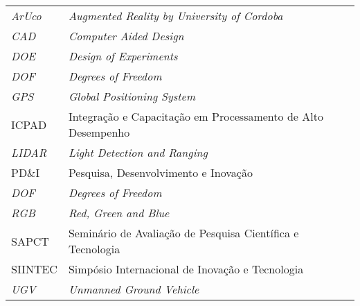 \begin{thesisabbreviations}
\begin{footnotesize}
\begin{longtable}[l]{p{2cm}l}
  \textit{ArUco}   \dotfill & \textit{Augmented Reality by University of Cordoba} \\
  \textit{CAD}      \dotfill &  \textit{Computer Aided Design} \\
  \textit{DOE}      \dotfill &  \textit{Design of Experiments} \\
  \textit{DOF}      \dotfill &  \textit{Degrees of Freedom} \\
  \textit{GPS}      \dotfill &  \textit{Global Positioning System} \\
  ICPAD      \dotfill &  Integração e Capacitação em Processamento de Alto Desempenho \\
  \textit{LIDAR} \dotfill & \textit{Light Detection and Ranging} \\
  PD\&I      \dotfill &  Pesquisa, Desenvolvimento e Inovação \\
    \textit{DOF}      \dotfill &  \textit{Degrees of Freedom} \\ 
    \textit{RGB}      \dotfill &  \textit{Red, Green and Blue} \\
  SAPCT      \dotfill &  Seminário de Avaliação de Pesquisa Científica e Tecnologia \\
  SIINTEC      \dotfill &  Simpósio Internacional de Inovação e Tecnologia \\
  \textit{UGV} \dotfill & \textit{Unmanned Ground Vehicle} \\
\end{longtable}
\end{footnotesize}
\end{thesisabbreviations}
